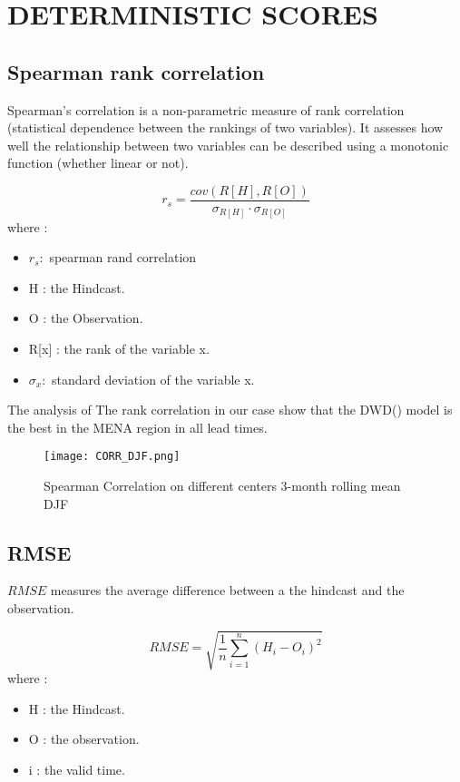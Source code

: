 \section{DETERMINISTIC SCORES}
\subsection{Spearman rank correlation}

Spearman's correlation is a non-parametric measure of rank correlation 
(statistical dependence between the rankings of two variables). 
It assesses how well the relationship between two variables can be described using a monotonic function (whether linear or not).  

$$r_s=\frac{cov(R[H],R[O])}{\sigma_{R[H]} \cdot \sigma_{R[O]}}$$
where : \\

\begin{itemize}
	\item $r_s : $ spearman rand correlation 
	\item H : the Hindcast.
	\item O : the Observation.
	\item R[x] : the rank of the variable x. 
	\item $\sigma_x : $ standard deviation of the variable x.
\end{itemize}

The analysis of The rank correlation in our case show that the DWD() model is the best in the MENA region in all lead times.

\begin{figure}[H]
	\texttt{[image: CORR\_DJF.png]}
	\caption{Spearman Correlation on different centers 3-month rolling mean DJF }
\end{figure}

 \subsection{RMSE}
 
 $RMSE$ measures the average difference between a the hindcast and the observation.
 
$$RMSE=\sqrt{\frac{1}{n} \sum\limits_{i=1}^{n}(H_i -O_i)^2}$$
where :
\begin{itemize}
	\item H : the Hindcast.
	\item O : the observation.
	\item i : the valid time.
\end{itemize}